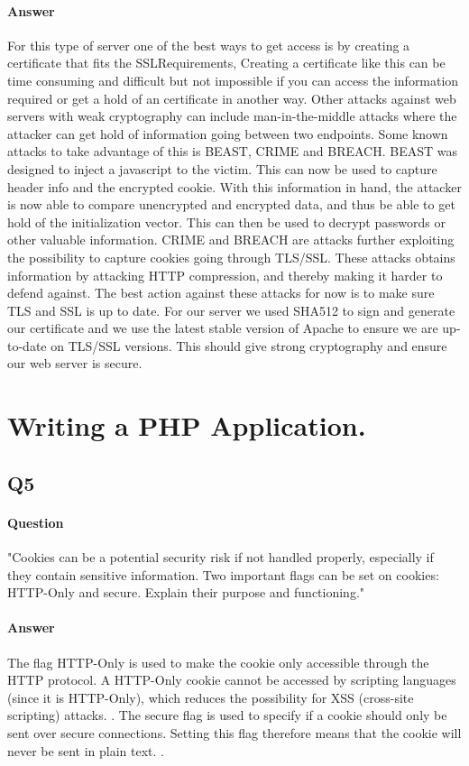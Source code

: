 \documentclass[11pt, a4paper]{article}
\begin{document}
\paragraph{Answer}
For this type of server one of the best ways to get access is by creating a certificate that fits the SSLRequirements, Creating a certificate like this can be time consuming and difficult but not impossible if you can access the information required or get a hold of an certificate in another way.
Other attacks against web servers with weak cryptography can include man-in-the-middle attacks where the attacker can get hold of information going between two endpoints. Some known attacks to take advantage of this is BEAST, CRIME and BREACH. BEAST was designed to inject a javascript to the victim. This can now be used to capture header info and the encrypted cookie. With this information in hand, the attacker is now able to compare unencrypted and encrypted data, and thus be able to get hold of the initialization vector. This can then be used to decrypt passwords or other valuable information\cite{context}. CRIME and BREACH are attacks further exploiting the possibility to capture cookies going through TLS/SSL. These attacks obtains information by attacking HTTP compression, and thereby making it harder to defend against\cite{iSEC}. The best action against these attacks for now is to make sure TLS and SSL is up to date.
For our server we used SHA512 to sign and generate our certificate and we use the latest stable version of Apache to ensure we are up-to-date on TLS/SSL versions. This should give strong cryptography and ensure our web server is secure.
\section{Writing a PHP Application.}
\subsection{Q5}
\paragraph{Question}
"Cookies can be a potential security risk if not handled properly, especially if they contain
sensitive information. Two important flags can be set on cookies: HTTP-Only and secure.
Explain their purpose and functioning."
\paragraph{Answer}
The flag HTTP-Only is used to make the cookie only accessible through the HTTP protocol. A HTTP-Only cookie cannot be accessed by scripting languages (since it is HTTP-Only), which reduces the possibility for XSS (cross-site scripting) attacks. \cite{cookie-http}.
The secure flag is used to specify if a cookie should only be sent over secure connections. Setting this flag therefore means that the cookie will never be sent in plain text. \cite{cookie-secure}.
\end{document}
